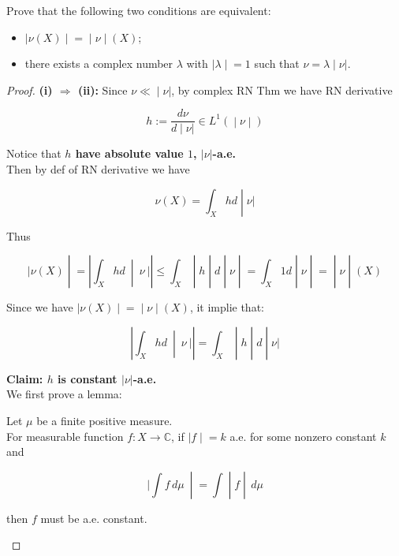 Prove that the following two conditions are equivalent:

\begin{itemize}
\item
  \(\left. |\nu(X) \middle| = \middle| \nu \middle| (X) \right.\);
\item
  there exists a complex number \(\lambda\) with \(\left. |\lambda \middle| = 1 \right.\) such that \(\left. \nu = \lambda \middle| \nu| \right.\).
\end{itemize}

\begin{proof}

\textbf{(i) \(\Longrightarrow\) (ii):} Since \(\left. \nu \ll \middle| \nu| \right.\), by complex RN Thm we have RN derivative

\[\left. h := \frac{d\nu}{\left. d \middle| \nu| \right.} \in L^{1}( \middle| \nu \middle| ) \right.\]

Notice that \textbf{\(h\) have absolute value \(1\), \(|\nu|\)-a.e.}\\
Then by def of RN derivative we have

\[\left. \nu(X) = \int_{X}hd \middle| \nu| \right.\]

Thus

\[\left. |\nu(X) \middle| = \left| \int_{X}hd\  \middle| \ \nu\ | \right| \leq \int_{X} \middle| h \middle| d \middle| \nu \middle| = \int_{X}1d \middle| \nu \middle| = \middle| \nu \middle| (X) \right.\]

Since we have \(\left. |\nu(X) \middle| = \middle| \nu \middle| (X) \right.\), it implie that:

\[\left. \left| \int_{X}hd\  \middle| \ \nu\ | \right| = \int_{X} \middle| h \middle| d \middle| \nu| \right.\]

\textbf{Claim: \(h\) is constant \(|\nu|\)-a.e.}\\
We first prove a lemma:

\begin{lemma}

Let \(\mu\) be a finite positive measure.\\
For measurable function \(f:X\rightarrow\mathbb{C}\), if \(\left. |f \middle| = k \right.\) a.e. for some nonzero constant \(k\) and

\[\left. |\int f\, d\mu\  \middle| = \int \middle| f \middle| \, d\mu \right.\]

then \(f\) must be a.e. constant.

\end{lemma}


\end{proof}
